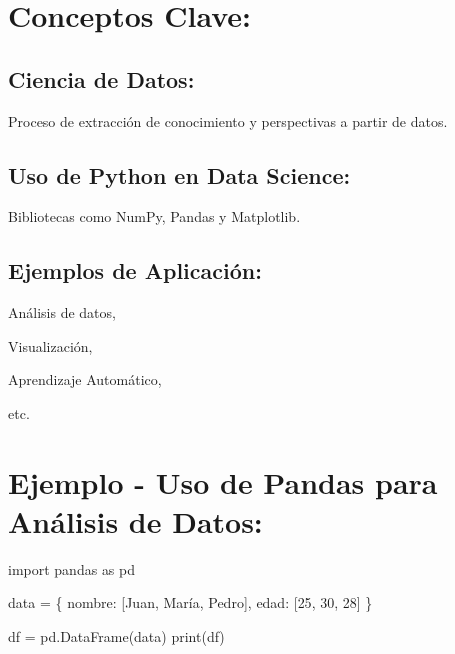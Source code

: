 \documentclass[
  a4paper,
  DIV=11,
  numbers=noendperiod,
  onepage,
  openany]{scrreprt}
\newenvironment{Shaded}{\begin{snugshade}}{\end{snugshade}}
\newcommand{\BuiltInTok}[1]{\textcolor[rgb]{0.00,0.23,0.31}{#1}}
\newcommand{\DecValTok}[1]{\textcolor[rgb]{0.68,0.00,0.00}{#1}}
\newcommand{\ImportTok}[1]{\textcolor[rgb]{0.00,0.46,0.62}{#1}}
\newcommand{\NormalTok}[1]{\textcolor[rgb]{0.00,0.23,0.31}{#1}}
\newcommand{\OperatorTok}[1]{\textcolor[rgb]{0.37,0.37,0.37}{#1}}
\newcommand{\StringTok}[1]{\textcolor[rgb]{0.13,0.47,0.30}{#1}}
\begin{document}
\hypertarget{conceptos-clave-63}{%
\section{Conceptos Clave:}\label{conceptos-clave-63}}

\hypertarget{ciencia-de-datos-1}{%
\subsection{Ciencia de Datos:}\label{ciencia-de-datos-1}}

Proceso de extracción de conocimiento y perspectivas a partir de datos.

\hypertarget{uso-de-python-en-data-science-1}{%
\subsection{Uso de Python en Data
Science:}\label{uso-de-python-en-data-science-1}}

Bibliotecas como NumPy, Pandas y Matplotlib.

\hypertarget{ejemplos-de-aplicaciuxf3n-1}{%
\subsection{Ejemplos de Aplicación:}\label{ejemplos-de-aplicaciuxf3n-1}}

Análisis de datos,

Visualización,

Aprendizaje Automático,

etc.

\hypertarget{ejemplo---uso-de-pandas-para-anuxe1lisis-de-datos-1}{%
\section{Ejemplo - Uso de Pandas para Análisis de
Datos:}\label{ejemplo---uso-de-pandas-para-anuxe1lisis-de-datos-1}}

\begin{Shaded}
\begin{Highlighting}[]
\ImportTok{import}\NormalTok{ pandas }\ImportTok{as}\NormalTok{ pd}

\NormalTok{data }\OperatorTok{=}\NormalTok{ \{}
    \StringTok{\textquotesingle{}nombre\textquotesingle{}}\NormalTok{: [}\StringTok{\textquotesingle{}Juan\textquotesingle{}}\NormalTok{, }\StringTok{\textquotesingle{}María\textquotesingle{}}\NormalTok{, }\StringTok{\textquotesingle{}Pedro\textquotesingle{}}\NormalTok{],}
    \StringTok{\textquotesingle{}edad\textquotesingle{}}\NormalTok{: [}\DecValTok{25}\NormalTok{, }\DecValTok{30}\NormalTok{, }\DecValTok{28}\NormalTok{]}
\NormalTok{\}}

\NormalTok{df }\OperatorTok{=}\NormalTok{ pd.DataFrame(data)}
\BuiltInTok{print}\NormalTok{(df)}
\end{Highlighting}
\end{Shaded}
\end{document}
